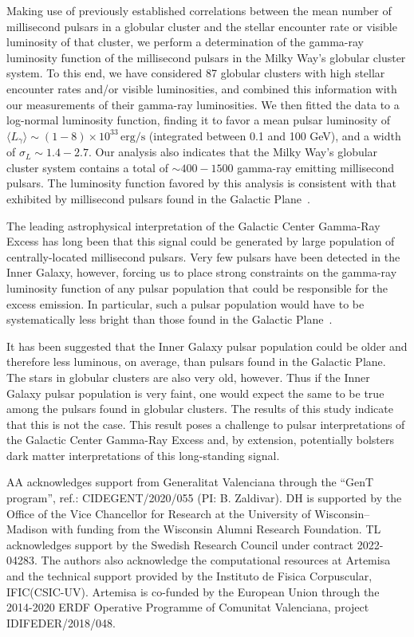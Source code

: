 \documentclass[a4paper,11pt]{article}
\begin{document}
Making use of previously established correlations between the mean number of millisecond pulsars in a globular cluster and the stellar encounter rate or visible luminosity of that cluster, we perform a determination of the gamma-ray luminosity function of the millisecond pulsars in the Milky Way's globular cluster system. To this end, we have considered 87 globular clusters with high stellar encounter rates and/or visible luminosities, and combined this information with our measurements of their gamma-ray luminosities. We then fitted the data to a log-normal luminosity function, finding it to favor a mean pulsar luminosity of $\langle L_{\gamma}\rangle \sim (1-8)\times 10^{33}\, \textrm{erg/s}$ (integrated between 0.1 and 100 GeV), and a width of $\sigma_L \sim 1.4-2.7$. Our analysis also indicates that the Milky Way's globular cluster system contains a total of $\sim 400-1500$ gamma-ray emitting millisecond pulsars. The luminosity function favored by this analysis is consistent with that exhibited by millisecond pulsars found in the Galactic Plane~\cite{Holst:2024fvb}.  

The leading astrophysical interpretation of the Galactic Center Gamma-Ray Excess has long been that this signal could be generated by large population of centrally-located millisecond pulsars. Very few pulsars have been detected in the Inner Galaxy, however, forcing us to place strong constraints on the gamma-ray luminosity function of any pulsar population that could be responsible for the excess emission. In particular, such a pulsar population would have to be systematically less bright than those found in the Galactic Plane~\cite{Holst:2024fvb}. 

It has been suggested that the Inner Galaxy pulsar population could be older and therefore less luminous, on average, than pulsars found in the Galactic Plane. The stars in globular clusters are also very old, however. Thus if the Inner Galaxy pulsar population is very faint, one would expect the same to be true among the pulsars found in globular clusters. The results of this study indicate that this is not the case. This result poses a challenge to pulsar interpretations of the Galactic Center Gamma-Ray Excess and, by extension, potentially bolsters dark matter interpretations of this long-standing signal. 

\bigskip

\acknowledgments
%
AA acknowledges support from Generalitat Valenciana through the “GenT program”, ref.: CIDEGENT/2020/055 (PI: B. Zaldivar). DH is supported by the Office of the Vice Chancellor for Research at the University of Wisconsin–Madison with funding from the Wisconsin Alumni Research Foundation. TL acknowledges support by the Swedish Research Council under contract 2022-04283. The authors also acknowledge the computational resources at Artemisa and the technical support provided by the Instituto de Fisica Corpuscular, IFIC(CSIC-UV). Artemisa is co-funded by the European Union through the 2014-2020 ERDF Operative Programme of Comunitat Valenciana, project IDIFEDER/2018/048.
\end{document}
